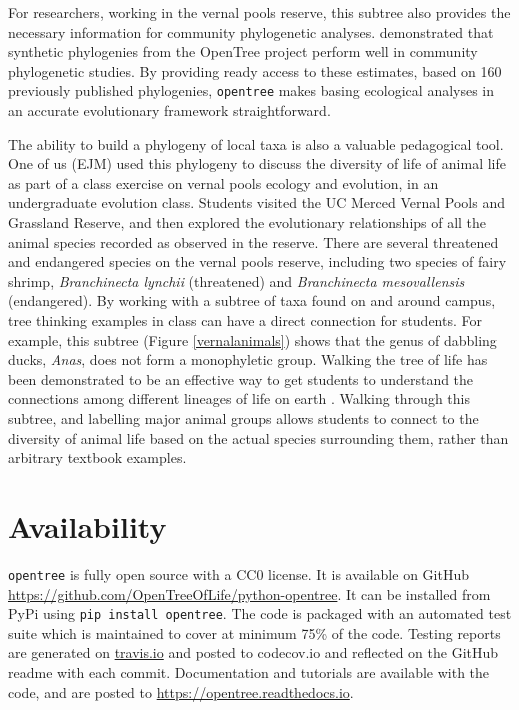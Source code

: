 \documentclass[oupdraft]{sysbio_sse}
\begin{document}
For researchers, working in the vernal pools reserve, this subtree also provides the necessary information for community phylogenetic analyses. \citet{li_for_2019} demonstrated that synthetic phylogenies from the OpenTree project perform well in community phylogenetic studies. By providing ready access to these estimates, based on 160 previously published phylogenies, \texttt{opentree} makes basing ecological analyses in an accurate evolutionary framework straightforward.


The ability to build a phylogeny of local taxa is also a valuable pedagogical tool. One of us (EJM) used this phylogeny to discuss the diversity of life of animal life as part of a class exercise on vernal pools ecology and evolution, in an undergraduate evolution class.
Students visited the UC Merced Vernal Pools and Grassland Reserve, and then explored the evolutionary relationships of all the animal species recorded as observed in the reserve.
There are several threatened and endangered species on the vernal pools reserve, including two species of fairy shrimp, \textit{Branchinecta lynchii} (threatened) and \textit{Branchinecta mesovallensis} (endangered).
By working with a subtree of taxa found on and around campus, tree thinking examples in class can have a direct connection for students. For example, this subtree (Figure \ref{vernalanimals}) shows that the genus of dabbling ducks, \textit{Anas}, does not form a monophyletic group. Walking the tree of life has been demonstrated to be an effective way to get students to understand the connections among different lineages of life on earth \citep{ballen_walking_2017}. Walking through this subtree, and labelling major animal groups allows students to connect to the diversity of animal life based on the actual species surrounding them, rather than arbitrary textbook examples.



\section{Availability}
\label{sec5}

\texttt{opentree} is fully open source with a CC0 license. It is available on GitHub \url{ https://github.com/OpenTreeOfLife/python-opentree}. It can be installed from PyPi using \texttt{pip install opentree}. The code is packaged with an automated test suite which is maintained to cover at minimum 75\% of the code. Testing reports are generated on \url{travis.io} and posted to {codecov.io} and reflected on the GitHub readme with each commit. Documentation and tutorials are available with the code, and are posted to \url{https://opentree.readthedocs.io}.
\end{document}

